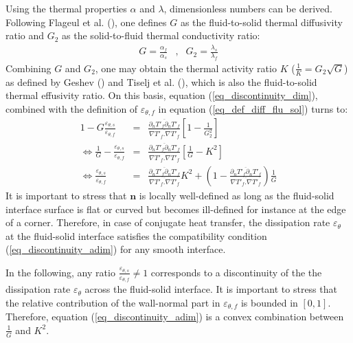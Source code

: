 \documentclass[review]{elsarticle}
\begin{document}
Using the thermal properties $\alpha$ and $\lambda$, dimensionless numbers can be derived. Following Flageul et al. (\cite{flageul2015dns}), one defines $G$ as the fluid-to-solid thermal diffusivity ratio and $G_2$ as the solid-to-fluid thermal conductivity ratio:
\begin{eqnarray}
G = \frac{\alpha_f}{\alpha_s} & , & G_2 = \frac{\lambda_s}{\lambda_f}
\end{eqnarray}
Combining $G$ and $G_2$, one may obtain the thermal activity ratio $K$ ($\frac{1}{K} = G_2 \sqrt{G}$) as defined by Geshev (\cite{geshev1978influence}) and Tiselj et al. (\cite{Tiselj2001dns}), which is also the fluid-to-solid thermal effusivity ratio.
On this basis, equation (\ref{eq_discontinuity_dim}), combined with the definition of $\varepsilon_{\theta,f}$ in equation (\ref{eq_def_diff_flu_sol}) turns to:
\begin{eqnarray} \label{eq_discontinuity_adim}
1 - G \frac{\varepsilon_{\theta,s}}{\varepsilon_{\theta,f}} & = & \frac{ \overline{ \partial_n T'_f \partial_n T'_f } }{ \overline{ \nabla T'_f . \nabla T'_f } } \left[ 1 - \frac{1}{G_2^2} \right] \nonumber \\
\Longleftrightarrow \frac{1}{G} - \frac{\varepsilon_{\theta,s}}{\varepsilon_{\theta,f}} & = & \frac{ \overline{ \partial_n T'_f \partial_n T'_f } }{ \overline{ \nabla T'_f . \nabla T'_f } } \left[ \frac{1}{G} - K^2 \right] \nonumber \\
\Longleftrightarrow \frac{\varepsilon_{\theta,s}}{\varepsilon_{\theta,f}} & = & \frac{ \overline{ \partial_n T'_f \partial_n T'_f } }{ \overline{ \nabla T'_f . \nabla T'_f } } K^2 + \left(1 - \frac{ \overline{ \partial_n T'_f \partial_n T'_f } }{ \overline{ \nabla T'_f . \nabla T'_f } } \right) \frac{1}{G}
\end{eqnarray}
It is important to stress that $\textbf{n}$ is locally well-defined as long as the fluid-solid interface surface is flat or curved but becomes ill-defined for instance at the edge of a corner.
Therefore, in case of conjugate heat transfer, the dissipation rate $\varepsilon_\theta$ at the fluid-solid interface satisfies the compatibility condition (\ref{eq_discontinuity_adim}) for any smooth interface.

In the following, any ratio $\frac{\varepsilon_{\theta,s}}{\varepsilon_{\theta,f}} \neq 1$ corresponds to a discontinuity of the the dissipation rate $\varepsilon_\theta$ across the fluid-solid interface.
It is important to stress that the relative contribution of the wall-normal part in $\varepsilon_{\theta,f}$ is bounded in $[0,1]$.
Therefore, equation (\ref{eq_discontinuity_adim}) is a convex combination between $\frac{1}{G}$ and $K^2$.
\end{document}
